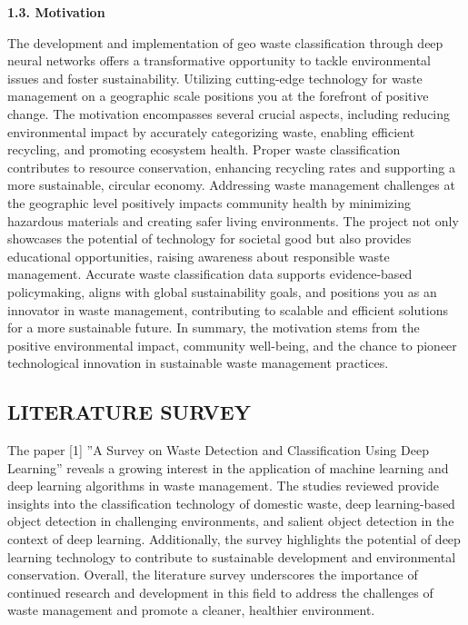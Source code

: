 \documentclass[12pt, English]{article}
\begin{document}
\begin{large}
\textbf{1.3. Motivation}
\end{large}
\begin{normalsize}
    
The development and implementation of geo waste classification through deep
neural networks offers a transformative opportunity to tackle environmental issues
and foster sustainability. Utilizing cutting-edge technology for waste management
on a geographic scale positions you at the forefront of positive change. The motivation encompasses several crucial aspects, including reducing environmental impact by accurately categorizing waste, enabling efficient recycling, and promoting
ecosystem health. Proper waste classification contributes to resource conservation, enhancing recycling rates and supporting a more sustainable, circular economy. Addressing waste management challenges at the geographic level positively
impacts community health by minimizing hazardous materials and creating safer
living environments. The project not only showcases the potential of technology
for societal good but also provides educational opportunities, raising awareness
about responsible waste management. Accurate waste classification data supports
evidence-based policymaking, aligns with global sustainability goals, and positions you as an innovator in waste management, contributing to scalable and efficient solutions for a more sustainable future. In summary, the motivation stems
from the positive environmental impact, community well-being, and the chance
to pioneer technological innovation in sustainable waste management practices.

\end{normalsize}

\newpage
\begin{center}
\section{ \Large LITERATURE SURVEY}
\end{center}
The paper [1] ”A Survey on Waste Detection and Classification Using Deep Learning” reveals a growing interest in the application of machine learning and deep learning algorithms in waste management. The studies reviewed provide insights into the classification technology of domestic waste, deep learning-based
object detection in challenging environments, and salient object detection in the context of deep learning. Additionally, the survey highlights the potential of deep learning technology to contribute to sustainable development and environmental conservation. Overall, the literature survey underscores the importance of continued research and development in this field to address the challenges of waste
management and promote a cleaner, healthier environment.\\
\end{document}
